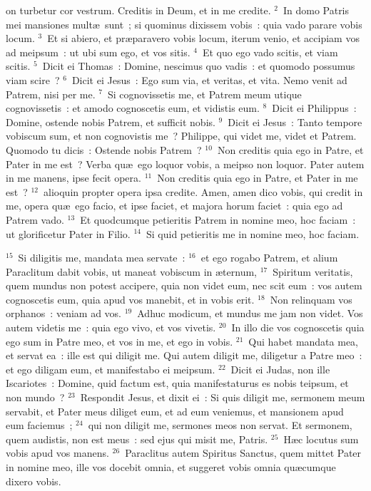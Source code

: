 \bchapter
{}on turbetur cor vestrum. Creditis in Deum, et in me credite.
${}^{2}$~In domo Patris mei mansiones mult\ae\ sunt~; si quominus dixissem vobis~: quia vado parare vobis locum.
${}^{3}$~Et si abiero, et pr\ae paravero vobis locum, iterum venio, et accipiam vos ad meipsum~: ut ubi sum ego, et vos sitis.
${}^{4}$~Et quo ego vado scitis, et viam scitis.
${}^{5}$~Dicit ei Thomas~: Domine, nescimus quo vadis~: et quomodo possumus viam scire~?
${}^{6}$~Dicit ei Jesus~: Ego sum via, et veritas, et vita. Nemo venit ad Patrem, nisi per me.
${}^{7}$~Si cognovissetis me, et Patrem meum utique cognovissetis~: et amodo cognoscetis eum, et vidistis eum.
${}^{8}$~Dicit ei Philippus~: Domine, ostende nobis Patrem, et sufficit nobis.
${}^{9}$~Dicit ei Jesus~: Tanto tempore vobiscum sum, et non cognovistis me~? Philippe, qui videt me, videt et Patrem. Quomodo tu dicis~: Ostende nobis Patrem~?
${}^{10}$~Non creditis quia ego in Patre, et Pater in me est~? Verba qu\ae\ ego loquor vobis, a meipso non loquor. Pater autem in me manens, ipse fecit opera.
${}^{11}$~Non creditis quia ego in Patre, et Pater in me est~?
${}^{12}$~alioquin propter opera ipsa credite. Amen, amen dico vobis, qui credit in me, opera qu\ae\ ego facio, et ipse faciet, et majora horum faciet~: quia ego ad Patrem vado.
${}^{13}$~Et quodcumque petieritis Patrem in nomine meo, hoc faciam~: ut glorificetur Pater in Filio.
${}^{14}$~Si quid petieritis me in nomine meo, hoc faciam.


${}^{15}$~Si diligitis me, mandata mea servate~:
${}^{16}$~et ego rogabo Patrem, et alium Paraclitum dabit vobis, ut maneat vobiscum in \ae ternum,
${}^{17}$~Spiritum veritatis, quem mundus non potest accipere, quia non videt eum, nec scit eum~: vos autem cognoscetis eum, quia apud vos manebit, et in vobis erit.
${}^{18}$~Non relinquam vos orphanos~: veniam ad vos.
${}^{19}$~Adhuc modicum, et mundus me jam non videt. Vos autem videtis me~: quia ego vivo, et vos vivetis.
${}^{20}$~In illo die vos cognoscetis quia ego sum in Patre meo, et vos in me, et ego in vobis.
${}^{21}$~Qui habet mandata mea, et servat ea~: ille est qui diligit me. Qui autem diligit me, diligetur a Patre meo~: et ego diligam eum, et manifestabo ei meipsum.
${}^{22}$~Dicit ei Judas, non ille Iscariotes~: Domine, quid factum est, quia manifestaturus es nobis teipsum, et non mundo~?
${}^{23}$~Respondit Jesus, et dixit ei~: Si quis diligit me, sermonem meum servabit, et Pater meus diliget eum, et ad eum veniemus, et mansionem apud eum faciemus~;
${}^{24}$~qui non diligit me, sermones meos non servat. Et sermonem, quem audistis, non est meus~: sed ejus qui misit me, Patris.
${}^{25}$~H\ae c locutus sum vobis apud vos manens.
${}^{26}$~Paraclitus autem Spiritus Sanctus, quem mittet Pater in nomine meo, ille vos docebit omnia, et suggeret vobis omnia qu\ae cumque dixero vobis.


